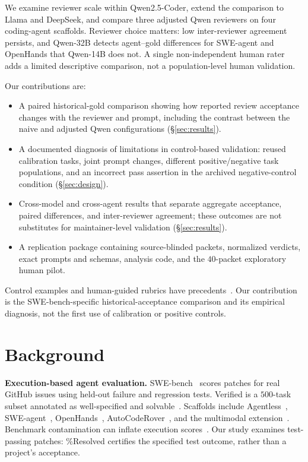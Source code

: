 \documentclass[10pt,conference]{IEEEtran}
\begin{document}
We examine reviewer scale within Qwen2.5-Coder, extend the comparison to Llama and DeepSeek,
and compare three adjusted Qwen reviewers on four coding-agent scaffolds. Reviewer choice
matters: low inter-reviewer agreement persists, and Qwen-32B detects agent--gold differences
for SWE-agent and OpenHands that Qwen-14B does not. A single non-independent human rater
adds a limited descriptive comparison, not a population-level human validation.

\noindent Our contributions are:
\begin{itemize}
\item A paired historical-gold comparison showing how reported review acceptance changes
with the reviewer and prompt, including the contrast between the naive and adjusted Qwen
configurations (\S\ref{sec:results}).
\item A documented diagnosis of limitations in control-based validation: reused calibration
tasks, joint prompt changes, different positive/negative task populations, and an incorrect
pass assertion in the archived negative-control condition (\S\ref{sec:design}).
\item Cross-model and cross-agent results that separate aggregate acceptance, paired
differences, and inter-reviewer agreement; these outcomes are not substitutes for
maintainer-level validation (\S\ref{sec:results}).
\item A replication package containing source-blinded packets, normalized verdicts, exact
prompts and schemas, analysis code, and the $40$-packet exploratory human pilot.
\end{itemize}
Control examples and human-guided rubrics have precedents~\cite{cihanreview,hitlpatch}.
Our contribution is the SWE-bench-specific historical-acceptance comparison and its
empirical diagnosis, not the first use of calibration or positive controls.

\section{Background}
\textbf{Execution-based agent evaluation.} SWE-bench~\cite{swebench} scores patches for
real GitHub issues using held-out failure and regression tests. Verified is a $500$-task
subset annotated as well-specified and solvable~\cite{swebenchverified}. Scaffolds include Agentless~\cite{agentless},
SWE-agent~\cite{sweagent}, OpenHands~\cite{wang2024openhands},
AutoCodeRover~\cite{zhang2024autocoderover}, and the multimodal
extension~\cite{yang2024swebenchmm}. Benchmark contamination can inflate execution
scores~\cite{riddell2024contamination}. Our study examines test-passing patches:
\%Resolved certifies the specified test outcome, rather than a project's acceptance.
\end{document}

